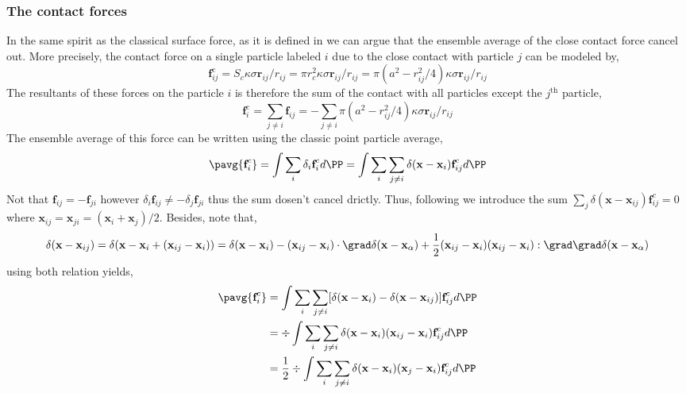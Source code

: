 \subsubsection*{The contact forces}
In the same spirit as the classical surface force, as it is defined in \citet{jackson1997locally,zhang1997momentum,nott2011suspension} we can argue that the ensemble average of the close contact force cancel out. 
More precisely, the contact force on a single particle labeled $i$ due to the close contact with particle $j$ can be modeled by, 
\begin{equation*}
    \textbf{f}_{ij}^\text{c}
    = S_c \kappa \sigma \textbf{r}_{ij}/r_{ij}
    = \pi r_c^2 \kappa \sigma \textbf{r}_{ij}/r_{ij}
    = \pi (a^2 - r_{ij}^2/4) \kappa \sigma  \textbf{r}_{ij}/r_{ij}
\end{equation*} 
The resultants of these forces on the particle $i$ is therefore the sum of the contact with all particles except the $j^\text{th}$ particle, 
\begin{equation*}
    \textbf{f}_{i}^\text{c}
    = \sum_{j \neq i}\textbf{f}_{ij}
    = - \sum_{j \neq i} \pi (a^2 - r_{ij}^2/4) \kappa \sigma \textbf{r}_{ij}/r_{ij}
\end{equation*} 
The ensemble average of this force can be written using the classic point particle average,
\begin{align}    
\pavg{\textbf{f}_i^c}
&=
\int \sum_{i} \delta_i 
\textbf{f}_i^c d\PP 
= \int \sum_{i} \sum_{j \neq i} \delta(\textbf{x} - \textbf{x}_i) 
\textbf{f}_{ij}^c d\PP 
\\
\end{align}
Not that $\textbf{f}_{ij} = - \textbf{f}_{ji}$ however $\delta_i \textbf{f}_{ij} \neq - \delta_j\textbf{f}_{ji}$ thus the sum dosen't cancel drictly. 
Thus, following \citet{nott2011suspension,zhang1997momentum} we introduce the sum $\sum_j \delta(\textbf{x}-\textbf{x}_{ij}) \textbf{f}_{ij}^c =0$ where $\textbf{x}_{ij} = \textbf{x}_{ji} = (\textbf{x}_i+\textbf{x}_j)/2$.
Besides, note that, 
\begin{equation*}
    \delta(\textbf{x} - \textbf{x}_{ij})
    = 
    \delta(\textbf{x} - \textbf{x}_i + ( \textbf{x}_{ij} - \textbf{x}_i))
    =
    \delta(\textbf{x} - \textbf{x}_i )
    - ( \textbf{x}_{ij} - \textbf{x}_i)\cdot \grad \delta(\textbf{x}-\textbf{x}_\alpha)
    +\frac{1}{2} (\textbf{x}_{ij} - \textbf{x}_i)(\textbf{x}_{ij} - \textbf{x}_i) : \grad\grad \delta(\textbf{x}-\textbf{x}_\alpha)
\end{equation*}
using both relation yields, 
\begin{align}    
    \pavg{\textbf{f}_i^c}
    &= \int \sum_{i} \sum_{j \neq i} [
        \delta(\textbf{x} - \textbf{x}_i)
        -\delta(\textbf{x} - \textbf{x}_{ij})]
    \textbf{f}_{ij}^c d\PP 
    \\
    &= \div \int \sum_{i} \sum_{j \neq i} \delta(\textbf{x}-\textbf{x}_i) (\textbf{x}_{ij} - \textbf{x}_i)
    \textbf{f}_{ij}^c d\PP 
    \\
    &= \frac{1}{2}\div \int \sum_{i} \sum_{j \neq i} \delta(\textbf{x}-\textbf{x}_i) (\textbf{x}_{j} - \textbf{x}_i)
    \textbf{f}_{ij}^c d\PP 
\end{align}
